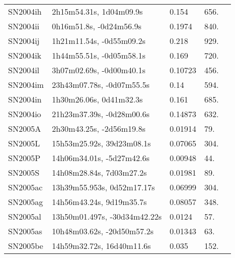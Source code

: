 \begin{longtable}{lllll}
         SN2004ih &        2h15m54.31s, 1d04m09.9s &    0.154 &           656. &    \citet{2005IAUC.8481A...1A} \\
         SN2004ii &        0h16m51.8s, -0d24m56.9s &   0.1974 &           840. &    \citet{2016SDSSD.C...0000:} \\
         SN2004ij &       1h21m11.54s, -0d55m09.2s &    0.218 &           929. &    \citet{2005IAUC.8481A...1A} \\
         SN2004ik &       1h44m55.51s, -0d05m58.1s &    0.169 &           720. &    \citet{2005IAUC.8481A...1A} \\
         SN2004il &       3h07m02.69s, -0d00m40.1s &  0.10723 &           456. &    \citet{2003SDSS1.C...0000:} \\
         SN2004im &      23h43m07.78s, -0d07m55.5s &     0.14 &           594. &    \citet{2005IAUC.8481A...1A} \\
         SN2004in &        1h30m26.06s, 0d41m32.3s &    0.161 &           685. &    \citet{2005IAUC.8481A...1A} \\
         SN2004io &      21h23m37.39s, -0d28m00.6s &  0.14873 &           632. &    \citet{2016SDSSD.C...0000:} \\
          SN2005A &       2h30m43.25s, -2d56m19.8s &  0.01914 &            79. &    \citet{1991RC3.9.C...0000d} \\
          SN2005L &      15h53m25.92s, 39d23m08.1s &  0.07065 &           304. &    \citet{2004SDSS3.C...0000:} \\
          SN2005P &      14h06m34.01s, -5d27m42.6s &  0.00948 &            44. &    \citet{2004AJ....128...16K} \\
          SN2005S &       14h08m28.84s, 7d03m27.2s &  0.01981 &            89. &    \citet{1995AJ....109..874B} \\
         SN2005ac &     13h39m55.953s, 0d52m17.17s &  0.06999 &           304. &    \citet{2003SDSS1.C...0000:} \\
         SN2005ag &       14h56m43.24s, 9d19m35.7s &  0.08057 &           348. &    \citet{2012MNRAS.422...25S} \\
         SN2005al &   13h50m01.497s, -30d34m42.22s &   0.0124 &            57. &    \citet{2000MNRAS.313..469S} \\
         SN2005as &     10h48m03.62s, -20d50m57.2s &  0.01343 &            63. &  \citet{1998AandAS..130..333T} \\
         SN2005be &      14h59m32.72s, 16d40m11.6s &    0.035 &           152. &    \citet{2005IAUC.8508B...1M} \\

\end{longtable}
